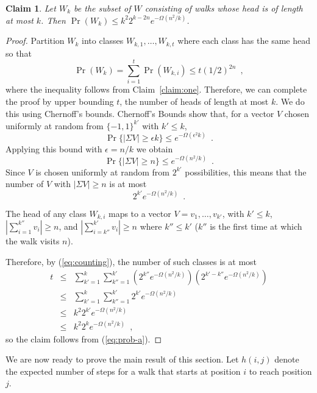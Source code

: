 \documentclass{article}
\newtheorem{clm}{Claim}
\begin{document}
\begin{clm}
Let $W_k$ be the subset of $W$ consisting of walks whose head is of
length at most $k$.  Then $\Pr(W_k) \le k^2 2^{k-2n}e^{-\Omega(n^2/k)}$.
\end{clm}

\begin{proof}
Partition $W_k$ into classes $W_{k,1},\ldots,W_{k,t}$ where each class has
the same head so that
\begin{equation}
  \Pr(W_k) = \sum_{i=1}^t \Pr(W_{k,i}) \le t(1/2)^{2n} \enspace ,
  \label{eq:prob-a}
\end{equation}
where the inequality follows from Claim~\ref{claim:one}.  Therefore, we
can complete the proof by upper bounding $t$, the number of heads of length at most $k$.
We do this using Chernoff's bounds.
Chernoff's Bounds show that, for a 
vector $V$ chosen uniformly at random from $\{-1,1\}^{k'}$ with $k' \le k$,
\[
   \Pr\{|\Sigma V| \ge \epsilon k\} \le e^{-\Omega(\epsilon^2 k)} \enspace .
\]
Applying this bound with $\epsilon = n/k$ we obtain
\[
   \Pr\{|\Sigma V| \ge n\} \le e^{-\Omega(n^2/k)} \enspace .
\]
Since $V$ is chosen uniformly at random from $2^{k'}$ possibilities,
this means that the number of $V$ with $|\Sigma V| \ge n$ is at most
\begin{equation}
  2^{k'}e^{-\Omega(n^2/k)} \enspace.
  \label{eq:counting}
\end{equation}

The head of any class $W_{k,i}$ maps to a vector $V=v_1,\ldots,v_{k'}$,
with $k'\le k$, $\left|\sum_{i=1}^{k''} v_i \right| \ge n$, and
$\left|\sum_{i=k''}^{k'} v_i \right| \ge n$ where $k'' \le k'$ ($k''$
is the first time at which the walk visits $n$).

Therefore, by (\ref{eq:counting}), the number of such classes is at most
\begin{eqnarray*}
  t & \le & \sum_{k'=1}^{k}\sum_{k''=1}^{k'} 
     \left(2^{k''}e^{-\Omega(n^2/k)}\right)
     \left(2^{k'-k''}e^{-\Omega(n^2/k)}\right) \\
   & \le & \sum_{k'=1}^{k}\sum_{k''=1}^{k'} 2^{k'}e^{-\Omega(n^2/k)} \\
   & \le & k^2 2^{k'}e^{-\Omega(n^2/k)} \\
   & \le & k^2 2^{k}e^{-\Omega(n^2/k)} \enspace ,
\end{eqnarray*}
so the claim follows from (\ref{eq:prob-a}).
\end{proof}

We are now ready to prove the main result of this section.  Let $h(i,j)$ denote the expected number of steps for a walk that starts at position $i$ to reach position $j$.
\end{document}
